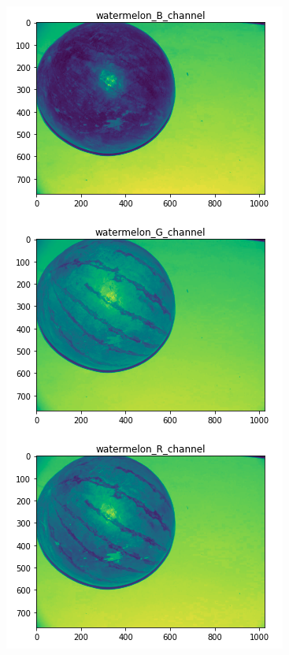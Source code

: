 \documentclass{article}
\begin{document}
\begin{multicols}{2}
\centering
{}
\includegraphics[scale=0.3]{../screenshots/RGB_3.png}


\end{multicols}
\end{document}
